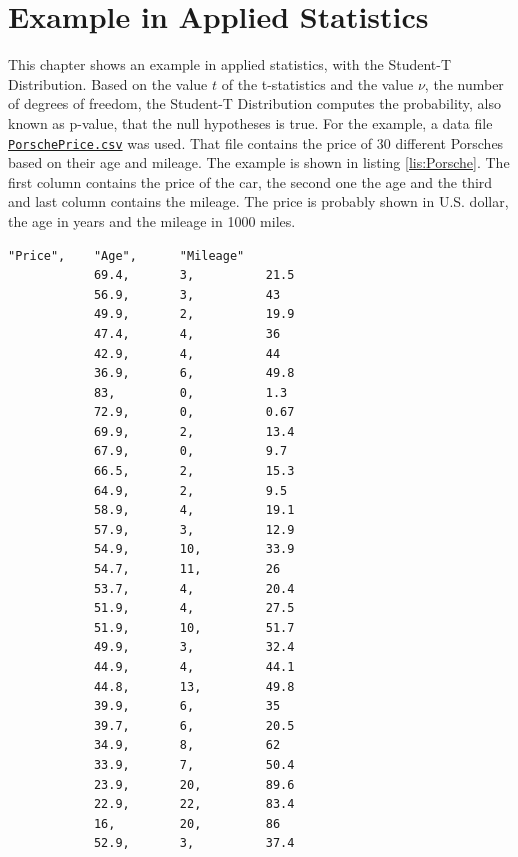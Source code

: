 
\chapter{Example in Applied Statistics}


	This chapter shows an example in applied statistics, with the Student-T Distribution. Based on the value $t$ of the t-statistics and the value $\nu$, the number of degrees of freedom, the Student-T Distribution computes the probability, also known as p-value, that the null hypotheses is true. For the example, a data file \href{https://vincentarelbundock.github.io/Rdatasets/csv/Stat2Data/PorschePrice.csv}{\lstinline{PorschePrice.csv}} was used. That file contains the price of 30 different Porsches based on their age and mileage. The example is shown in listing \ref{lis:Porsche}. The first column contains the price of the car, the second one the age and the third and last column contains the mileage. The price is probably shown in U.S. dollar, the age in years and the mileage in 1000 miles.

	\begin{center}
		\begin{lstlisting}[caption={\lstinline{PorschePrice.csv} Example}, label={lis:Porsche}]
			"Price",	"Age",		"Mileage"
			69.4,		3,			21.5
			56.9,		3,			43
			49.9,		2,			19.9
			47.4,		4,			36
			42.9,		4,			44
			36.9,		6,			49.8
			83,			0,			1.3
			72.9,		0,			0.67
			69.9,		2,			13.4
			67.9,		0,			9.7
			66.5,		2,			15.3
			64.9,		2,			9.5
			58.9,		4,			19.1
			57.9,		3,			12.9
			54.9,		10,			33.9
			54.7,		11,			26
			53.7,		4,			20.4
			51.9,		4,			27.5
			51.9,		10,			51.7
			49.9,		3,			32.4
			44.9,		4,			44.1
			44.8,		13,			49.8
			39.9,		6,			35
			39.7,		6,			20.5
			34.9,		8,			62
			33.9,		7,			50.4
			23.9,		20,			89.6
			22.9,		22,			83.4
			16,			20,			86
			52.9,		3,			37.4
		\end{lstlisting}
	\end{center}

